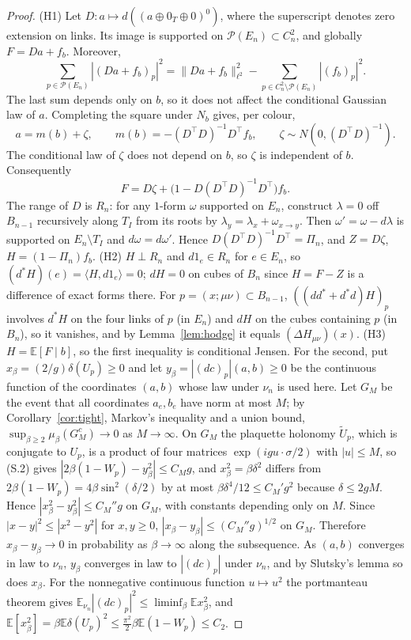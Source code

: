 \documentclass[11pt,a4paper]{article}
\theoremstyle{plain}
\theoremstyle{definition}
\theoremstyle{remark}
\numberwithin{equation}{section}
\newcommand{\E}{\mathbb{E}}
\newcommand{\cP}{\mathcal{P}}
\newcommand{\Tg}{\widetilde U}
\begin{document}
\begin{proof}
(H1) Let $D:a\mapsto d((a\oplus0_T\oplus0)^0)$, where the superscript denotes zero extension on links.
Its image is supported on $\cP(E_n)\subset C_n^2$, and globally $F=Da+f_b$.
Moreover,
\[
\sum_{p\in\cP(E_n)}|(Da+f_b)_p|^2
=
\|Da+f_b\|_{\ell^2}^2
-\sum_{p\in C_n^2\setminus\cP(E_n)}|(f_b)_p|^2.
\]
The last sum depends only on $b$, so it does not affect the conditional Gaussian law of $a$.
Completing the square under $N_b$ gives, per colour,
\[
a=m(b)+\zeta,
\qquad
m(b)=-(D^\top D)^{-1}D^\top f_b,
\qquad
\zeta\sim N(0,(D^\top D)^{-1}).
\]
The conditional law of $\zeta$ does not depend on $b$, so $\zeta$ is independent of $b$.
Consequently
\[
F=D\zeta+\bigl(1-D(D^\top D)^{-1}D^\top\bigr)f_b.
\]
The range of $D$ is $R_n$: for any $1$-form $\omega$ supported on $E_n$, construct $\lambda=0$ off $B_{n-1}$ recursively along $T_I$
from its roots by $\lambda_y=\lambda_x+\omega_{x\to y}$.
Then $\omega'=\omega-d\lambda$ is supported on $E_n\setminus T_I$ and $d\omega=d\omega'$.
Hence $D(D^\top D)^{-1}D^\top=\Pi_n$, and
$Z=D\zeta$, $H=(1-\Pi_n)f_b$.
(H2) $H\perp R_n$ and $d1_e\in R_n$ for $e\in E_n$, so $(d^*H)(e)=\langle H,d1_e\rangle=0$; $dH=0$ on cubes of $B_n$ since $H=F-Z$ is a
difference of exact forms there. For $p=(x;\mu\nu)\subset B_{n-1}$, $((dd^*+d^*d)H)_p$ involves $d^*H$ on the four links of $p$ (in $E_n$)
and $dH$ on the cubes containing $p$ (in $B_n$), so it vanishes, and by Lemma~\ref{lem:hodge} it equals $(\Delta H_{\mu\nu})(x)$.
(H3) $H=\E[F\mid b]$, so the first inequality is conditional Jensen. For the second, put $x_\beta=(2/g)\delta(U_p)\ge0$ and let $y_\beta=|(dc)_p|(a,b)\ge0$ be
the continuous function of the coordinates $(a,b)$ whose law under $\nu_n$ is used here. Let $G_M$ be the event that all coordinates $a_e,b_e$ have norm at most $M$; by Corollary~\ref{cor:tight},
Markov's inequality and a union bound, $\sup_{\beta\ge2}\mu_\beta(G_M^c)\to0$ as $M\to\infty$. On $G_M$ the plaquette holonomy $\Tg_p$, which is conjugate to $U_p$, is a product of four matrices
$\exp(igu\cdot\sigma/2)$ with $|u|\le M$, so (S.2) gives $|2\beta(1-W_p)-y_\beta^2|\le C_Mg$, and $x_\beta^2=\beta\delta^2$ differs from $2\beta(1-W_p)=4\beta\sin^2(\delta/2)$ by at most
$\beta\delta^4/12\le C_M'g^2$ because $\delta\le2gM$. Hence $|x_\beta^2-y_\beta^2|\le C_M''g$ on $G_M$, with constants depending only on $M$. Since
$|x-y|^2\le|x^2-y^2|$ for $x,y\ge0$, $|x_\beta-y_\beta|\le(C_M''g)^{1/2}$ on $G_M$. Therefore
$x_\beta-y_\beta\to0$ in probability as $\beta\to\infty$ along the subsequence. As $(a,b)$ converges in law to $\nu_n$, $y_\beta$ converges in law to
$|(dc)_p|$ under $\nu_n$, and by Slutsky's lemma so does $x_\beta$. For the nonnegative continuous function $u\mapsto u^2$ the portmanteau theorem gives
$\E_{\nu_n}|(dc)_p|^2\le\liminf_\beta\E x_\beta^2$, and
$\E[x_\beta^2]=\beta\E\delta(U_p)^2\le\frac{\pi^2}2\beta\E(1-W_p)\le C_2$.
\end{proof}
\end{document}
